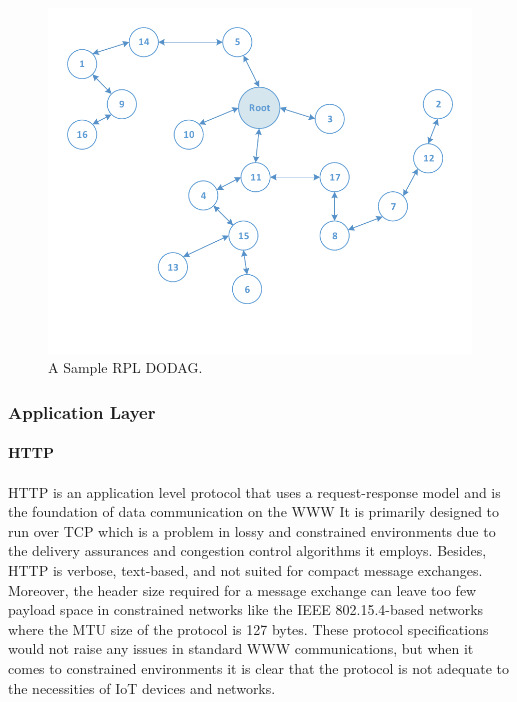 \begin{figure}[h!]
  \centering
  \includegraphics[width=1.0\linewidth]{figures/RPL_DODAG.pdf}
  \caption{A Sample RPL DODAG.}
  \label{fig:rpl_dodag}
\end{figure}

\subsubsection{Application Layer}

\paragraph{\textbf{\ac{HTTP}}}
\paragraph{}
	\ac{HTTP} is an application level protocol that uses a request-response model and is the foundation of data communication on the \ac{WWW} It is primarily designed to run over \ac{TCP} which is a problem in lossy and constrained environments due to the delivery assurances and congestion control algorithms it employs. Besides, {HTTP} is verbose, text-based, and not suited for compact message exchanges. Moreover, the header size required for a message exchange can leave too few payload space in constrained networks like the IEEE 802.15.4-based networks where the \ac{MTU} size of the protocol is 127 bytes. These protocol specifications would not raise any issues in standard \ac{WWW} communications, but when it comes to constrained environments it is clear that the protocol is not adequate to the necessities of \ac{IoT} devices and networks.

